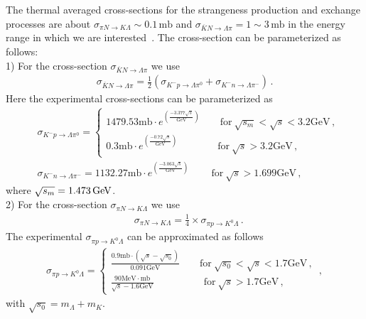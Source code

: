 The thermal averaged cross-sections for the strangeness production and exchange processes are about $\sigma_{\pi N\rightarrow K\Lambda}\sim0.1\,\mathrm{mb}$ and $\sigma_{\overline{K}N\rightarrow \Lambda\pi}=1\sim3\,\mathrm{mb}$ in the energy range in which we are interested~\cite{Koch:1986ud}. The cross-section can be parameterized as follows:\\
1) For the cross-section $\sigma_{\overline{K}N\rightarrow \Lambda\pi}$ we use~\cite{Koch:1986ud}
 \begin{align}
 \sigma_{\overline{K}N\rightarrow \Lambda\pi}=\frac{1}{2}\left(\sigma_{K^-p\rightarrow \Lambda\pi^0}+\sigma_{K^-n\rightarrow \Lambda\pi^-}\right)\,.
\end{align}
Here the experimental cross-sections can be parameterized as 
\begin{align}
&\sigma_{K^-p\rightarrow \Lambda\pi^0}\!\!=\!\!\left\{\begin{array}{l}\!\!1479.53\mathrm{mb}\!\cdot\!\displaystyle e^{\left(\frac{-3.377\sqrt{s}}{\mathrm{GeV}}\right)}\qquad   \mathrm{for\ } \sqrt{s_m}\!\!<\!\!\sqrt{s}\!<\!3.2\mathrm{GeV}\,, \\[0.5cm]
0.3\mathrm{mb}\!\cdot\!\displaystyle e^{\left(\frac{-0.72\sqrt{s}}{\mathrm{GeV}}\right)}\qquad\qquad   \mathrm{for\ }\sqrt{s}>3.2\mathrm{GeV}\,,\end{array}\right.
\\[0.4cm]
&\sigma_{K^-n\rightarrow \Lambda\pi^-}\!\!=\!\!1132.27\mathrm{mb}\!\cdot\!e^{\left(\frac{-3.063\sqrt{s}}{\mathrm{GeV}}\right)} \qquad\   \mathrm{for\ }\sqrt{s}>1.699\mathrm{GeV}\,,
\end{align}
where $\sqrt{s_m}=1.473\text{\,GeV}$.\\
2) For the cross-section $\sigma_{\pi N\rightarrow K\Lambda}$ we use~\cite{Cugnon:1984pm}
\begin{align}
&\sigma_{\pi N\rightarrow K\Lambda}=\frac{1}{4}\times\sigma_{\pi p\rightarrow K^0\Lambda}\,.
\end{align}
The experimental $\sigma_{\pi p\rightarrow K^0\Lambda}$ can be approximated as follows
\begin{align}
\sigma_{\pi p\rightarrow K^0\Lambda}=\left\{
\begin{array}{l}
\displaystyle\frac{0.9\mathrm{mb}\cdot\left(\sqrt{s}-\sqrt{s_0}\right)}{0.091\mathrm{GeV}}\qquad  \mathrm{for\ } \sqrt{s_0}<\sqrt{s}<1.7\mathrm{GeV}\,, \\[0.5cm]
\displaystyle\frac{90\mathrm{MeV\cdot mb}}{\sqrt{s}-1.6\mathrm{GeV}}\qquad\qquad \quad  \mathrm{for\
 }\sqrt{s}>1.7\mathrm{GeV}\,,\end{array}\right.
 \,,
 \end{align}
 with $ \sqrt{s_0}=m_\Lambda+m_K$. 

